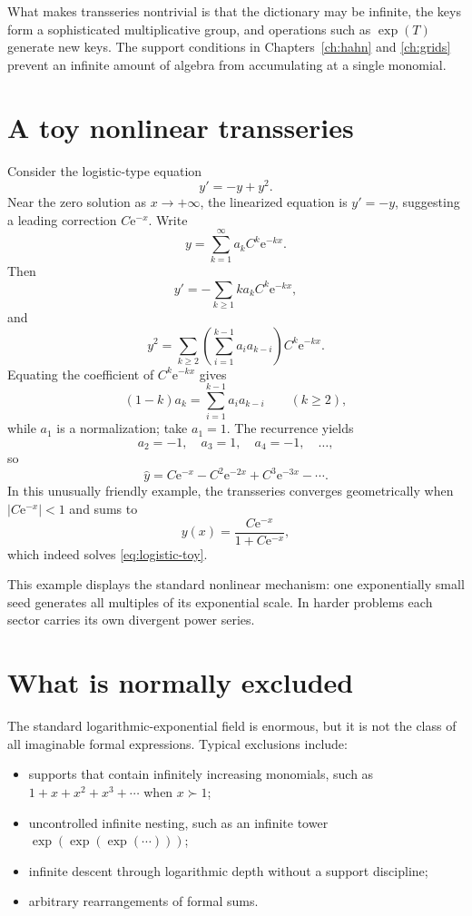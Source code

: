 \documentclass[11pt,openany]{book}
\theoremstyle{definition}
\theoremstyle{plain}
\theoremstyle{remark}
\newcommand{\e}{\mathrm{e}}
\newcommand{\succdom}{\succ}
\newcommand{\trans}[1]{\widehat{#1}}
\begin{document}
What makes transseries nontrivial is that the dictionary may be infinite, the keys form a sophisticated multiplicative group, and operations such as $\exp(T)$ generate new keys. The support conditions in Chapters~\ref{ch:hahn} and \ref{ch:grids} prevent an infinite amount of algebra from accumulating at a single monomial.

\section{A toy nonlinear transseries}

Consider the logistic-type equation
\begin{equation}\label{eq:logistic-toy}
 y'=-y+y^2.
\end{equation}
Near the zero solution as $x\to+\infty$, the linearized equation is $y'=-y$, suggesting a leading correction $C\e^{-x}$. Write
\[
 y=\sum_{k=1}^{\infty}a_k C^k\e^{-kx}.
\]
Then
\[
 y'=-\sum_{k\ge1}k a_kC^k\e^{-kx},
\]
and
\[
 y^2=\sum_{k\ge2}
 \left(\sum_{i=1}^{k-1}a_i a_{k-i}\right)
 C^k\e^{-kx}.
\]
Equating the coefficient of $C^k\e^{-kx}$ gives
\[
 (1-k)a_k=\sum_{i=1}^{k-1}a_i a_{k-i}
 \qquad(k\ge2),
\]
while $a_1$ is a normalization; take $a_1=1$. The recurrence yields
\[
 a_2=-1,
 \quad a_3=1,
 \quad a_4=-1,
 \quad\ldots,
\]
so
\begin{equation}\label{eq:logistic-geometric}
 \trans y=C\e^{-x}-C^2\e^{-2x}+C^3\e^{-3x}-\cdots.
\end{equation}
In this unusually friendly example, the transseries converges geometrically when $|C\e^{-x}|<1$ and sums to
\begin{equation}\label{eq:logistic-closed}
 y(x)=\frac{C\e^{-x}}{1+C\e^{-x}},
\end{equation}
which indeed solves \cref{eq:logistic-toy}.

This example displays the standard nonlinear mechanism: one exponentially small seed generates all multiples of its exponential scale. In harder problems each sector carries its own divergent power series.

\section{What is normally excluded}

The standard logarithmic-exponential field is enormous, but it is not the class of all imaginable formal expressions. Typical exclusions include:

\begin{itemize}
\item supports that contain infinitely increasing monomials, such as $1+x+x^2+x^3+\cdots$ when $x\succdom1$;
\item uncontrolled infinite nesting, such as an infinite tower $\exp(\exp(\exp(\cdots)))$;
\item infinite descent through logarithmic depth without a support discipline;
\item arbitrary rearrangements of formal sums.
\end{itemize}
\end{document}
